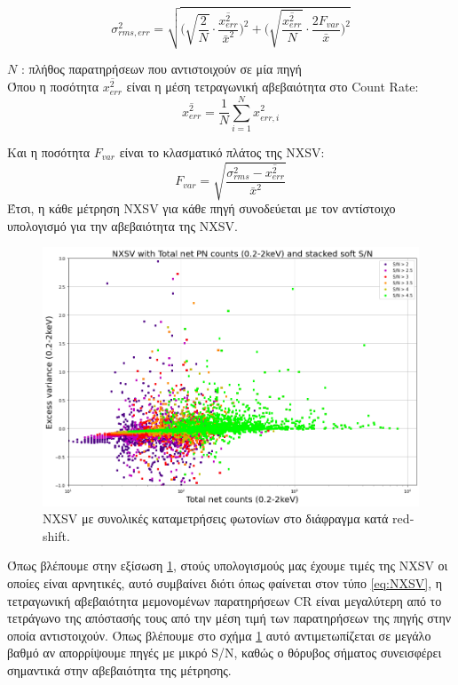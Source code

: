 \begin{equation}  \sigma^2_{rms, err} = \sqrt{ \Big( \sqrt{\frac{2}{N}}\cdot \frac{\overline{ x^2_{err} }}{\bar{x}^2} \Big)^2 + \Big( \sqrt{ \frac{\overline{ x^2_{err}}}{N}    }   \cdot \frac{2F_{var}}{\bar x}  \Big)^2  }  \label{eq:NXSVerr} \end{equation}

$N$ : πλήθος παρατηρήσεων που αντιστοιχούν σε μία πηγή \\
Όπου η ποσότητα $\overline{ x^2_{err}}$ είναι η μέση τετραγωνική αβεβαιότητα στο \textlatin{Count Rate}:     
\begin{equation}  \overline{ x^2_{err}} =   \frac{1}{N }   \sum_{i=1}^{N} x_{err, i}^2  \end{equation}
 
Και η ποσότητα $F_{var} $ είναι το κλασματικό πλάτος της \textlatin{NXSV}:    
\begin{equation} F_{var} = \sqrt{ \frac{ \sigma^2_{rms} -  \overline{ x^2_{err}}   } {{\bar x}^2}  }     \end{equation}
Έτσι, η κάθε μέτρηση \textlatin{NXSV} για κάθε πηγή συνοδεύεται με τον αντίστοιχο υπολογισμό για την αβεβαιότητα της \textlatin{NXSV}.

  \begin{figure}
 \begin{center}
 \includegraphics[width=0.9\linewidth]{Figures/NXSV_Counts_zweight.png}
 \caption{\textlatin{NXSV} με συνολικές καταμετρήσεις φωτονίων στο διάφραγμα κατά \textlatin{redshift.}}
 \label{fig:NXSV_counts}
 \end{center}
 \end{figure}

Όπως βλέπουμε στην εξίσωση \ref{fig:NXSV_counts}, στούς υπολογισμούς μας έχουμε τιμές της \textlatin{NXSV} οι οποίες είναι αρνητικές, αυτό συμβαίνει διότι όπως φαίνεται στον τύπο \ref{eq:NXSV}, η τετραγωνική αβεβαιότητα μεμονομένων παρατηρήσεων \textlatin{CR} είναι μεγαλύτερη από το τετράγωνο της απόστασής τους από την μέση τιμή των παρατηρήσεων της πηγής στην οποία αντιστοιχούν. Όπως βλέπουμε στο σχήμα \ref{fig:NXSV_counts} αυτό αντιμετωπίζεται σε μεγάλο βαθμό αν απορρίψουμε πηγές με μικρό \textlatin{S/N}, καθώς ο θόρυβος σήματος συνεισφέρει σημαντικά στην αβεβαιότητα της μέτρησης. 

